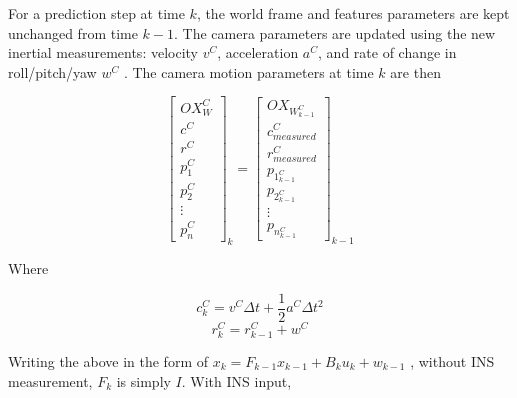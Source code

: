 For a prediction step at time $k$, the world frame and features 
parameters are kept unchanged from time $k-1$. The camera parameters 
are updated using the new inertial measurements: velocity $v^{C}$, 
acceleration $a^{C}$, and rate of change in roll/pitch/yaw $w^{C}$
. The camera motion parameters at time $k$ are then

\begin{equation}
\begin{bmatrix}
OX_{W}^{C}\\
c^{C}\\
r^{C}\\
p_{1}^{C}\\
p_{2}^{C}\\
\vdots\\
p_n^C
\end{bmatrix}_{k}=
\begin{bmatrix}
OX_{W}_{k-1}^{C}\\
c_{measured}^{C}\\
r_{measured}^{C}\\
p_{1}_{k-1}^{C}\\
p_{2}_{k-1}^{C}\\
\vdots\\
p_n_{k-1}^C
\end{bmatrix}_{k-1}
\end{equation}

Where 

$$c_{k}^{C}=v^{C}\Delta t+ \frac{1}{2}a^{C}\Delta t^{2}$$
$$r_{k}^{C}=r_{k-1}^{C}+ w^{C}$$

Writing the above in the form of $x_{k}= F_{k-1}x_{k-1}+ 
B_{k}u_{k}+w_{k-1}$ , without INS measurement, $F_{k}$ is  
simply $I$. With INS input, 

